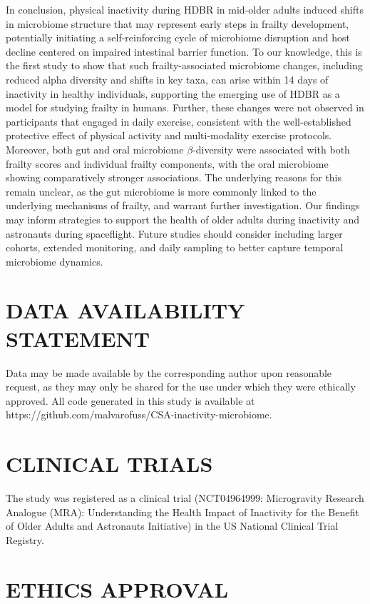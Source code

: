 \documentclass[preprint,12pt,authoryear]{elsarticle}
\begin{document}
    In conclusion, physical inactivity during HDBR in mid-older adults induced shifts in microbiome structure that may represent early steps in frailty development, potentially initiating a self-reinforcing cycle of microbiome disruption and host decline centered on impaired intestinal barrier function. To our knowledge, this is the first study to show that such frailty-associated microbiome changes, including reduced alpha diversity and shifts in key taxa, can arise within 14 days of inactivity in healthy individuals, supporting the emerging use of HDBR as a model for studying frailty in humans. Further, these changes were not observed in participants that engaged in daily exercise, consistent with the well-established protective effect of physical activity and multi-modality exercise protocols. Moreover, both gut and oral microbiome $\beta$-diversity were associated with both frailty scores and individual frailty components, with the oral microbiome showing comparatively stronger associations. The underlying reasons for this remain unclear, as the gut microbiome is more commonly linked to the underlying mechanisms of frailty, and warrant further investigation. Our findings may inform strategies to support the health of older adults during inactivity and astronauts during spaceflight. Future studies should consider including larger cohorts, extended monitoring, and daily sampling to better capture temporal microbiome dynamics.

\section{DATA AVAILABILITY STATEMENT}

    Data may be made available by the corresponding author upon reasonable request, as they may only be shared for the use under which they were ethically approved. All code generated in this study is available at https://github.com/malvarofuss/CSA-inactivity-microbiome.

\section{CLINICAL TRIALS}

    The study was registered as a clinical trial (NCT04964999: Microgravity Research Analogue (MRA): Understanding the Health Impact of Inactivity for the Benefit of Older Adults and Astronauts Initiative) in the US National Clinical Trial Registry. 

\section{ETHICS APPROVAL}
\end{document}
